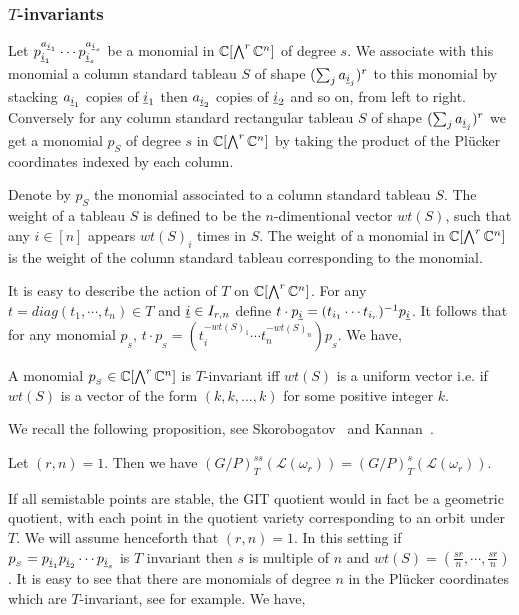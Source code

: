\subsubsection{$T$-invariants}
\label{sec:hb_grass}

\label{sec:torus_action}
Let \(p_{{\underline i}_1}^{a_{{\underline i}_1}}\cdots p_{{\underline i}_s}^{a_{{\underline i}_s}}\) be a monomial in \(\mathbb{C}[\bigwedge^r \mathbb{C}^n]\) of degree \(s\). We associate with this monomial a column standard tableau \(S\) of shape \((\sum_j  a_{{\underline i}_j} )^r  \) to this monomial by stacking $a_{{\underline i}_1}$ copies of ${\underline i}_1$ then $a_{{\underline i}_2}$ copies of ${\underline i}_2$ and so on, from left to right. Conversely for any column standard rectangular tableau \(S\) of shape \((\sum_j  a_{{\underline i}_j} )^r  \)  we get a monomial $p_{S}$ of degree \(s\) in \(\mathbb{C}[\bigwedge^r\mathbb{C}^n]\) by taking the product of the Pl\"{u}cker coordinates 
indexed by each column.  

Denote by \(p_{S}\) the monomial associated to a column standard tableau \(S\). The weight of a tableau \(S\) is defined to be the
\(n\)-dimentional vector \(wt(S)\), such that any \(i \in [n]\) appears \(wt(S)_i\) times in \(S\). The weight of a monomial in \(\mathbb{C}[\bigwedge^r\mathbb{C}^n]\) is the weight of the column standard tableau corresponding to the monomial.  

It is easy to describe the action of \(T\) on \(\mathbb{C}[\bigwedge^r\mathbb{C}^n]\).  For any \(t = diag(t_1,\cdots,t_n) \in T\) and \({\underline i} \in I_{r,n}\) define \(t\cdot p_{\underline i} = (t_{i_1}\cdots t_{i_r})^{-1}p_{\underline i}\).  It follows that for any monomial \(p_{_S}\), \(t\cdot p_{_S} = (t_i^{-wt(S)_1}\cdots t_n^{-wt(S)_n})p_{_S}\). 
We have, 
\begin{proposition}
\label{prop:tinv}
 A monomial \(p_{_S} \in \mathbb{C}[\bigwedge^r\mathbb{C}^n]\) is \(T\)-invariant iff \(wt(S)\) is a uniform vector i.e. if \(wt(S)\)  is a vector of the form $(k,k,\ldots,k)$ for some positive integer $k $.
\end{proposition}

We recall the following proposition, see Skorobogatov~\cite{skorobogatov1993swinnerton} and Kannan~\cite{kannan1998torus}.
\begin{proposition}
Let $(r,n)=1$. Then we have $(G/P)^{ss}_{T}({\mathcal L}(\omega_r)) = (G/P)^{s}_{T}({\mathcal L}(\omega_r)).$
\end{proposition}

If all semistable points are stable, the GIT quotient would in fact be a geometric quotient, with each point in the quotient variety corresponding to an orbit under $T$. We will assume 
henceforth that $(r,n)=1$. In this setting if  \(p_{_S} = p_{{\underline i}_1} p_{{\underline i}_2} \cdots p_{{\underline i}_s}\) is $T$ invariant then 
\(s\) is multiple of \(n\) and \(wt(S) = (\frac{sr}{n},\cdots,\frac{sr}{n})\). It is easy to see that there are monomials of degree \(n\) in the Pl\"{u}cker coordinates which are \(T\)-invariant, see \cite{bakshi2020torus} for example. We have,


